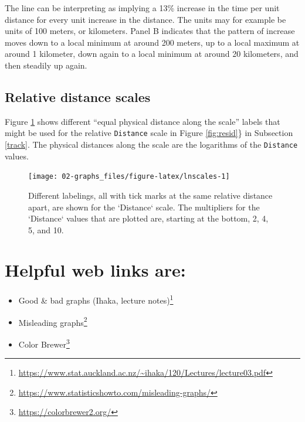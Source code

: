 \documentclass[
  10pt,
  b5paper]{book}
\providecommand{\tightlist}{%
  \setlength{\itemsep}{0pt}\setlength{\parskip}{0pt}}
\begin{document}
The line can be interpreting as implying a 13\% increase in the time
per unit distance for every unit increase in the distance. The units
may for example be units of 100 meters, or kilometers. Panel B
indicates that the pattern of increase moves down to a local minimum
at around 200 meters, up to a local maximum at around 1 kilometer, down
again to a local minimum at around 20 kilometers, and then steadily up
again.

\hypertarget{relative-distance-scales}{%
\subsection*{Relative distance scales}\label{relative-distance-scales}}

Figure \ref{fig:lnscales} shows different ``equal physical distance
along the scale'' labels that might be used for the relative
\texttt{Distance} scale in Figure \ref{fig:resid}\} in Subsection
\ref{track}. The physical distances along the scale are the
logarithms of the \texttt{Distance} values.

\begin{figure}[H]

{\centering \texttt{[image: 02-graphs\_files/figure-latex/lnscales-1]} 

}

\caption{Different labelings, all with tick marks at the same
relative distance apart, are shown for the `Distance` scale.
The multipliers for the `Distance` values that are plotted are,
starting at the bottom, 2, 4, 5, and 10.}\label{fig:lnscales}
\end{figure}

\hypertarget{helpful-web-links-are}{%
\section{Helpful web links are:}\label{helpful-web-links-are}}

\begin{itemize}
\tightlist
\item
  Good \& bad graphs (Ihaka, lecture notes)\footnote{\url{https://www.stat.auckland.ac.nz/~ihaka/120/Lectures/lecture03.pdf}}
\item
  Misleading graphs\footnote{\url{https://www.statisticshowto.com/misleading-graphs/}}
\item
  Color Brewer\footnote{\url{https://colorbrewer2.org/}}
\end{itemize}
\end{document}
